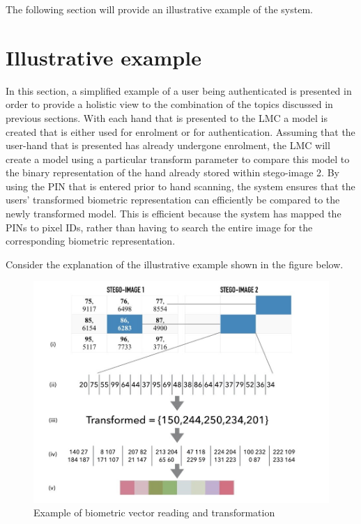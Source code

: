The following section will provide an illustrative example of the system.

\section{Illustrative example}

In this section, a simplified example of a user being authenticated is presented in order to provide a holistic view to the combination of the topics discussed in previous sections.
With each hand that is presented to the LMC a model is created that is either used for enrolment or for authentication. Assuming that the user-hand that is presented has already undergone enrolment, the LMC will create a model using a particular transform parameter to compare this model to the binary representation of the hand already stored within stego-image 2. By using the PIN that is entered prior to hand scanning, the system ensures that the users’ transformed biometric representation can efficiently be compared to the newly transformed model. This is efficient because the system has mapped the PINs to pixel IDs, rather than having to search the entire image for the corresponding biometric representation.

Consider the explanation of the illustrative example shown in the figure below.

    
    \begin{figure}[htbp!] 
    \centering    
    \includegraphics[width=1.0\textwidth]{Chapter3/Figs/Example_of_biometric_vector_reading_and_transformation.jpg}
    \caption[Example of biometric vector reading and transformation]{Example of biometric vector reading and transformation}
    \label{fig:Example of biometric vector reading and transformation}
    \end{figure}

